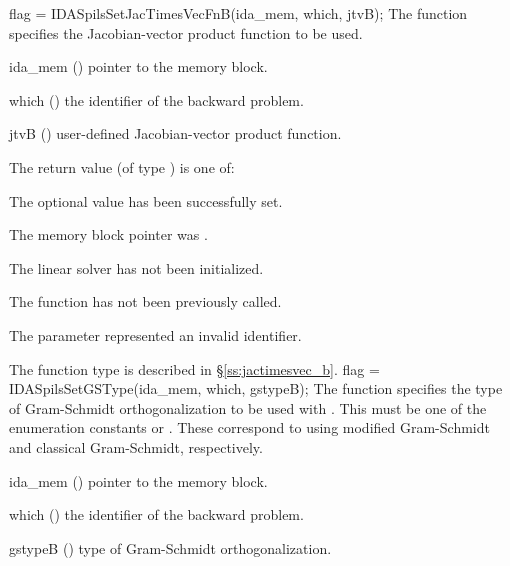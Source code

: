 {
  flag = IDASpilsSetJacTimesVecFnB(ida\_mem, which, jtvB);
}
{
  The function  specifies the Jacobian-vector 
  product function to be used.
}
{
  \begin{args}
  \item[ida\_mem] ()
    pointer to the {\idas} memory block.
  \item[which] ()
    the identifier of the backward problem.
  \item[jtvB] ()
    user-defined Jacobian-vector product function.
  \end{args}
}
{
  The return value  (of type ) is one of:
  \begin{args}
  \item[\Id{IDASPILS\_SUCCESS}] 
    The optional value has been successfully set.
  \item[\Id{IDASPILS\_MEM\_NULL}]
    The  memory block pointer was .
  \item[\Id{IDASPILS\_LMEM\_NULL}]
    The {\idaspils} linear solver has not been initialized.
  \item[\Id{IDASPILS\_NO\_ADJ}]
    The function  has not been previously called.
  \item[\Id{IDASPILS\_ILL\_INPUT}]
    The parameter  represented an invalid identifier.
  \end{args}
}
{
  The function type  is described in
  \S\ref{ss:jactimesvec_b}.
}
{
  flag = IDASpilsSetGSType(ida\_mem, which, gstypeB);
}
{
  The function  specifies the type of
  Gram-Schmidt orthogonalization to be used with {\idaspgmr}.
  This must be one of the enumeration constants 
  or . These correspond to using modified Gram-Schmidt 
  and classical Gram-Schmidt, respectively. 
}
{
  \begin{args}[gstypeB]
  \item[ida\_mem] ()
    pointer to the {\idas} memory block.
  \item[which] ()
    the identifier of the backward problem.
  \item[gstypeB] ()
    type of Gram-Schmidt orthogonalization.
  \end{args}
}
